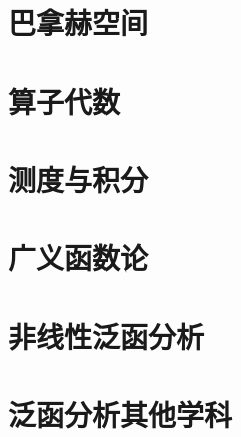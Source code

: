 \documentclass[UTF8]{../09-Mathematics}
\begin{document}
\section{巴拿赫空间}
\section{算子代数}
\section{测度与积分}
\section{广义函数论}
\section{非线性泛函分析}
\section{泛函分析其他学科}
\end{document}
